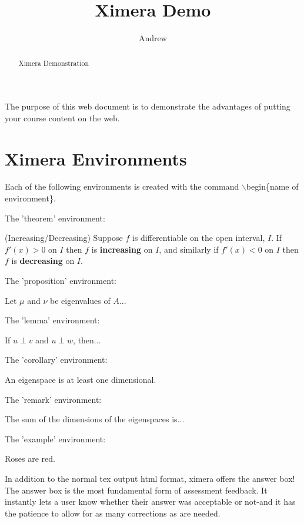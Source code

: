 \documentclass{ximera}
\title{Ximera Demo}
\author{Andrew}
\begin{document}
\begin{abstract}
    Ximera Demonstration
\end{abstract}


\maketitle

The purpose of this web document is to demonstrate the advantages of putting your course content on the web.

\section{Ximera Environments}

Each of the following environments is created with the command $\backslash$begin\{name of environment\}.

The 'theorem' environment:
\begin{theorem}(Increasing/Decreasing)
    Suppose $f$ is differentiable on the open interval, $I$. If $f'(x) >0$ on $I$ then $f$ is {\bf increasing} on $I$, and similarly
    if $f'(x) <0$ on $I$ then $f$ is {\bf decreasing} on $I$.
\end{theorem}

The 'proposition' environment:
\begin{proposition}
    Let $\mu$ and $\nu$ be eigenvalues of $A$...
\end{proposition}

The 'lemma' environment:
\begin{lemma}
    If $u \perp v$ and $u \perp w$, then...
\end{lemma}

The 'corollary' environment:
\begin{corollary}
    An eigenspace is at least one dimensional.
\end{corollary}

The 'remark' environment:
\begin{remark}
    The sum of the dimensions of the eigenspaces is...
\end{remark}

The 'example' environment:
\begin{example}
    Roses are red.
\end{example}
In addition to the normal tex output html format, ximera offers the answer box! The answer box is the most fundamental form of assessment feedback. It instantly lets a user know whether their answer was acceptable or not-and it has the patience to allow for as many corrections as are needed.
\end{document}
